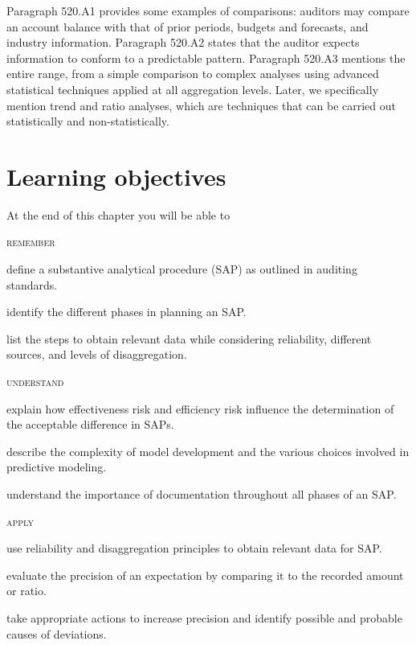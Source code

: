 Paragraph 520.A1 provides some examples of comparisons: auditors may compare an account balance with that of prior periods, budgets and forecasts, and industry information. Paragraph 520.A2 states that the auditor expects information to conform to a predictable pattern. Paragraph 520.A3 mentions the entire range, from a simple comparison to complex analyses using advanced statistical techniques applied at all aggregation levels. Later, we specifically mention trend and ratio analyses, which are techniques that can be carried out statistically and non-statistically.






\section*{Learning objectives}
At the end of this chapter you will be able to

\textsc{remember}
\begin{compactitem}
\item define a substantive analytical procedure (SAP) as outlined in auditing standards.
\item identify the different phases in planning an SAP.
\item list the steps to obtain relevant data while considering reliability, different sources, and levels of disaggregation.
\end{compactitem}

\textsc{understand}
\begin{compactitem}
\item explain how effectiveness risk and efficiency risk influence the determination of the acceptable difference in SAPs.
\item describe the complexity of model development and the various choices involved in predictive modeling.
\item understand the importance of documentation throughout all phases of an SAP.
\end{compactitem}

\textsc{apply}
\begin{compactitem}
\item use reliability and disaggregation principles to obtain relevant data for SAP.
\item evaluate the precision of an expectation by comparing it to the recorded amount or ratio.
\item take appropriate actions to increase precision and identify possible and probable causes of deviations.
\end{compactitem}

